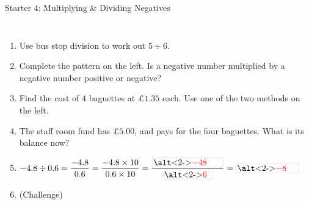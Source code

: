 \documentclass{beamer}
\newcommand{\ashow}[1]{\uncover<2->{\textcolor{red}{\small #1}}}
\newcommand{\abox}[1]{%
  \tikz[baseline=(b.base)]\node[draw=gray, densely dotted, inner sep=1.5pt] (b)
    {\alt<2->{\textcolor{red}{#1}}{\phantom{#1}}};%
}
\newcommand{\tightlist}{%
  \setlength{\itemsep}{0pt}\setlength{\parskip}{0pt}\setlength{\topsep}{0pt}%
}
\begin{document}
\begin{frame}[t]{Starter 4: Multiplying \& Dividing Negatives}
\begin{columns}[T,onlytextwidth]
\vspace{-1.5em}
\footnotesize
\begin{enumerate}\tightlist
{}
  \item Use bus stop division to work out $5\div6$.
        \ashow{$0.8\dot{3}$}
  \item Complete the pattern on the left. Is a negative number multiplied by a
        negative number positive or negative?
        \ashow{Positive}
  \item Find the cost of $4$ baguettes at £$1.35$ each. Use one of the two methods on
        the left.
        \ashow{£$5.40$}
  \item The staff room fund has £$5.00$, and pays for the four baguettes. What is its
        balance now?
        \ashow{$5.00-5.40=-0.40$, so $-$£$0.40$}
  \item $-4.8\div0.6=\dfrac{-4.8}{0.6}=\dfrac{-4.8\times10}{0.6\times10}
        =\dfrac{\abox{$-48$}}{\abox{$6$}}=\abox{$-8$}$
  \item[] \vspace{3pt}(Challenge)
\end{enumerate}
\end{columns}
\end{frame}
\end{document}
